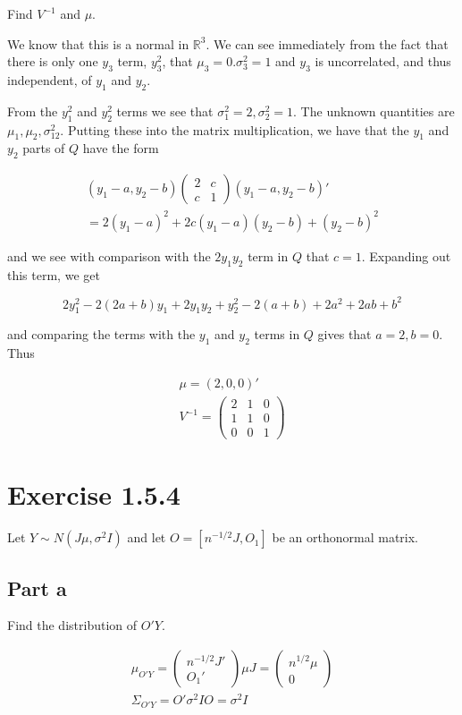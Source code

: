 \documentclass{article}
\newcommand{\R}{\mathbb{R}}
\begin{document}
Find $V^{-1}$ and $\mu$.

We know that this is a normal in $\R^3$. We can see immediately from the fact that there is only one $y_3$ term, $y_3^2$, that $\mu_3 = 0. \sigma^2_3 = 1$ and $y_3$ is uncorrelated, and thus independent, of $y_1$ and $y_2$.

From the $y_1^2$ and $y_2^2$ terms we see that $\sigma_1^2=2, \sigma_2^2=1$. The unknown quantities are $\mu_1, \mu_2, \sigma_{12}^2$. Putting these into the matrix multiplication, we have that the $y_1$ and $y_2$ parts of $Q$ have the form

\begin{gather*}
(y_1-a, y_2-b)\begin{pmatrix}2 & c \\ c & 1\end{pmatrix}
(y_1-a, y_2-b)' \\
=2(y_1-a)^2 + 2c(y_1-a)(y_2-b) + (y_2-b)^2
\end{gather*}

and we see with comparison with the $2y_1y_2$ term in $Q$ that $c=1$. Expanding out this term, we get

\[
2y_1^2 -2(2a+b)y_1 + 2y_1y_2 + y_2^2 - 2(a+b) + 2a^2 + 2ab + b^2
\]

and comparing the terms with the $y_1$ and $y_2$ terms in $Q$ gives that $a=2, b=0$. Thus

\begin{gather*}
\mu = (2, 0, 0)' \\
V^{-1} = \begin{pmatrix}
2 & 1 & 0\\
1 & 1 & 0\\
0 & 0 & 1
\end{pmatrix}
\end{gather*}

\section*{Exercise 1.5.4}

Let $Y \sim N(J\mu, \sigma^2I)$ and let $O = [n^{-1/2}J, O_1]$ be an orthonormal matrix.

\subsection*{Part a}

Find the distribution of $O'Y$.

\begin{gather*}
\mu_{O'Y} = \begin{pmatrix} n^{-1/2}J' \\ O_1'\end{pmatrix} \mu J = \begin{pmatrix} n^{1/2} \mu \\ 0 \end{pmatrix} \\
\Sigma_{O'Y} = O'\sigma^2IO = \sigma^2I
\end{gather*}
\end{document}
